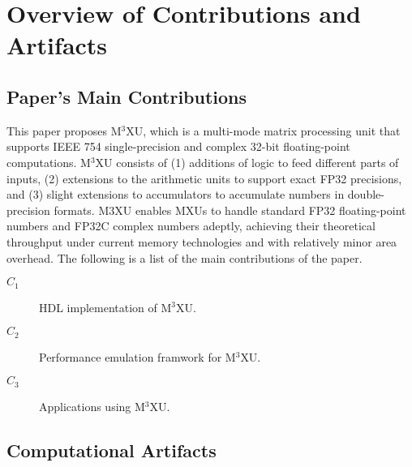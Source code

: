 \documentclass[conference]{IEEEtran}
\newcommand{\MPCMXU}[1]{M$^{3}$XU}
\begin{document}


\appendixAD

\section{Overview of Contributions and Artifacts}

\subsection{Paper's Main Contributions}

This paper proposes \MPCMXU{}, which is a multi-mode matrix processing unit 
that supports IEEE 754 single-precision and complex 32-bit floating-point computations. 
\MPCMXU{} consists of 
(1) additions of logic to feed different parts of inputs, 
(2) extensions to the arithmetic units to support exact FP32 precisions, and 
(3) slight extensions to accumulators to accumulate numbers in double-precision formats. 
M3XU enables MXUs to handle standard FP32 floating-point numbers and FP32C complex numbers adeptly, 
achieving their theoretical throughput under current memory technologies and with relatively minor area overhead.
The following is a list of the main contributions of the paper.

\begin{description}
\item[$C_1$] HDL implementation of \MPCMXU{}.
\item[$C_2$] Performance emulation framwork for \MPCMXU{}.
\item[$C_3$] Applications using \MPCMXU{}.
\end{description}

\subsection{Computational Artifacts}

\end{document}
